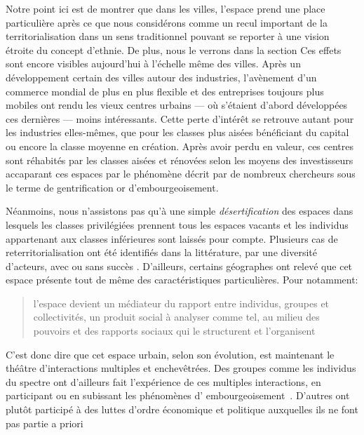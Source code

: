 Notre point ici est de montrer que dans les villes, l'espace prend une place particulière après ce que nous considérons comme un recul important de la territorialisation dans un sens traditionnel pouvant se reporter à une vision étroite du concept d'ethnie. 
De plus, nous le verrons dans la section  
Ces effets sont encore visibles aujourd'hui à l'échelle même des villes. 
Après un développement certain des villes autour des industries, l'avènement d'un commerce mondial de plus en plus flexible et des entreprises toujours plus mobiles ont rendu les vieux centres urbains --- où s'étaient d'abord développées ces dernières --- moins intéressants.
Cette perte d'intérêt se retrouve autant pour les industries elles-mêmes, que pour les classes plus aisées bénéficiant du capital ou encore la classe moyenne en création. 
Après avoir perdu en valeur, ces centres sont réhabités par les classes aisées et rénovées selon les moyens des investisseurs accaparant ces espaces par le phénomène décrit par de nombreux chercheurs sous le terme de gentrification or d'embourgeoisement.

Néanmoins, nous n'assistons pas qu'à une simple \emph{désertification} des espaces dans lesquels les classes privilégiées prennent tous les espaces vacants et les individus appartenant aux classes inférieures sont laissés pour compte.
Plusieurs cas de reterritorialisation ont été identifiés dans la littérature, par une diversité d'acteurs, avec ou sans succès \citet{Hatvany2005}. 
D'ailleurs, certains géographes ont relevé que cet espace présente tout de même des caractéristiques particulières. 
Pour \citeauthor{Courville1991} notamment: \blockquote[{\cite[41]{Courville1991}}][.]{l'espace devient un médiateur du rapport entre individus, groupes et collectivités, un produit social à analyser comme tel, au milieu des pouvoirs et des rapports sociaux qui le structurent et l'organisent}.

C'est donc dire que cet espace urbain, selon son évolution, est maintenant le théâtre d'interactions multiples et enchevêtrées. 
Des groupes comme les individus du spectre \lgbt{} ont d'ailleurs fait l'expérience de ces multiples interactions, en participant ou en subissant les phénomènes d’ embourgeoisement~\autocite{Podmore2001,Giraud2014,Hogan2005}. 
D'autres ont plutôt participé à des luttes d'ordre économique et politique auxquelles ils ne font pas partie a priori~\autocite{Kelliher2014} 

